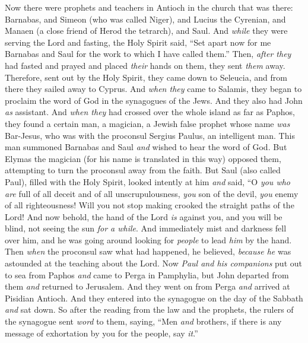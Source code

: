 \begin{biblechapter} %
 Now there were prophets and teachers in Antioch in the church that was there: Barnabas, and Simeon (who was called Niger), and Lucius the Cyrenian, and Manaen (a close friend of Herod the tetrarch), and Saul.
\verse And \textit{while} they were serving the Lord and fasting, the Holy Spirit said, “Set apart now for me Barnabas and Saul for the work to which I have called them.”
\verse Then, \textit{after they} had fasted and prayed and placed \textit{their} hands on them, they sent \textit{them} away.
 Therefore, sent out by the Holy Spirit, they came down to Seleucia, and from there they sailed away to Cyprus.
\verse And \textit{when they} came to Salamis, they began to proclaim the word of God in the synagogues of the Jews. And they also had John \textit{as} assistant.
\verse And \textit{when they} had crossed over the whole island as far as Paphos, they found a certain man, a magician, a Jewish false prophet whose name \textit{was} Bar-Jesus,
\verse who was with the proconsul Sergius Paulus, an intelligent man. This man summoned Barnabas and Saul \textit{and} wished to hear the word of God.
\verse But Elymas the magician (for his name is translated in this way) opposed them, attempting to turn the proconsul away from the faith.
\verse But Saul (also called Paul), filled with the Holy Spirit, looked intently at him
\verse \textit{and} said, “O \textit{you who are} full of all deceit and of all unscrupulousness, \textit{you} son of the devil, \textit{you} enemy of all righteousness! Will you not stop making crooked the straight paths of the Lord!
\verse And now behold, the hand of the Lord \textit{is} against you, and you will be blind, not seeing the sun \textit{for a while}. And immediately mist and darkness fell over him, and he was going around looking for \textit{people} to lead \textit{him} by the hand.
\verse Then \textit{when} the proconsul saw what had happened, he believed, \textit{because he} was astounded at the teaching about the Lord.
 Now \textit{Paul and his companions} put out to sea from Paphos \textit{and} came to Perga in Pamphylia, but John departed from them \textit{and} returned to Jerusalem.
\verse And they went on from Perga \textit{and} arrived at Pisidian Antioch. And they entered into the synagogue on the day of the Sabbath \textit{and} sat down.
\verse So after the reading from the law and the prophets, the rulers of the synagogue sent \textit{word} to them, saying, “Men \textit{and} brothers, if there is any message of exhortation by you for the people, say \textit{it}.”

\end{biblechapter}
